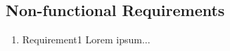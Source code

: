           
             \subsection{Non-functional Requirements}
                \begin{enumerate}[label=(\alph*)]
              \setlength\itemsep{1.5pt}
              \item Requirement1 \linebreak
            Lorem ipsum...
            
             \end{enumerate}

        
            